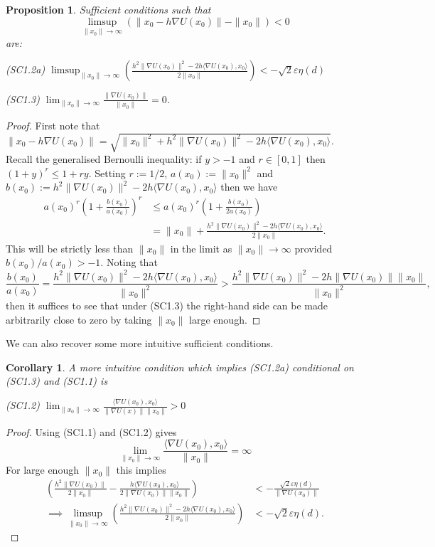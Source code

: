 \documentclass[bj,numbers,noshowframe]{imsart}
\newcommand{\e}{\varepsilon}
\theoremstyle{definition}
\theoremstyle{plain}
\newtheorem{prop}[defn]{Proposition}
\newtheorem{crly}[defn]{Corollary}
\theoremstyle{definition}
\begin{document}
\begin{prop}
Sufficient conditions such that
\[
\limsup_{\|x_{0}\|\to\infty}\left(\|x_{0}-h\nabla U(x_{0})\|-\|x_{0}\|\right)<0
\]
are:


(SC1.2a) $\limsup_{\|x_{0}\|\to\infty}\left(\frac{h^{2}\|\nabla U(x_{0})\|^{2}-2h\langle\nabla U(x_{0}),x_{0}\rangle}{2\|x_{0}\|}\right)< -\sqrt{2} \e \eta(d)$
\vspace{0.3cm}

(SC1.3) $\lim_{\|x_{0}\|\to\infty}\frac{\|\nabla U(x_{0})\|}{\|x_{0}\|}=0$.
\end{prop}
\begin{proof}
First note that $\|x_{0}-h\nabla U(x_{0})\|=\sqrt{\|x_{0}\|^{2}+h^{2}\|\nabla U(x_{0})\|^{2}-2h\langle\nabla U(x_{0}),x_{0}\rangle}$.
Recall the generalised Bernoulli inequality: if $y>-1$ and $r\in[0,1]$
then $\left(1+y\right)^{r}\leq1+ry$. Setting $r:=1/2$, $a(x_{0}):=\|x_{0}\|^{2}$
and $b(x_{0}):=h^{2}\|\nabla U(x_{0})\|^{2}-2h\langle\nabla U(x_{0}),x_{0}\rangle$
then we have
\begin{align*}
a(x_{0})^{r}\left(1+\frac{b(x_{0})}{a(x_{0})}\right)^{r} &\leq a(x_{0})^{r}\left(1+\frac{b(x_{0})}{2a(x_{0})}\right) \\ 
&=\|x_{0}\|+\frac{h^{2}\|\nabla U(x_{0})\|^{2}-2h\langle\nabla U(x_{0}),x_{0}\rangle}{2\|x_{0}\|}.
\end{align*}
This will be strictly less than $\|x_{0}\|$ in the limit as $\|x_{0}\|\to\infty$
provided $b(x_{0})/a(x_{0})>-1$. Noting that
\[
\frac{b(x_{0})}{a(x_{0})}=\frac{h^{2}\|\nabla U(x_{0})\|^{2}-2h\langle\nabla U(x_{0}),x_{0}\rangle}{\|x_{0}\|^{2}}>\frac{h^{2}\|\nabla U(x_{0})\|^{2}-2h\|\nabla U(x_{0})\|\|x_{0}\|}{\|x_{0}\|^{2}},
\]
then it suffices to see that under (SC1.3) the right-hand side can
be made arbitrarily close to zero by taking $\|x_{0}\|$ large enough.
\end{proof}
We can also recover some more intuitive sufficient conditions.
\begin{crly}
\label{crly:intuitive}A more intuitive condition which implies (SC1.2a)
conditional on (SC1.3) and (SC1.1) is
\vspace{0.3cm}

(SC1.2) $\lim_{\|x_{0}\|\to\infty}\frac{\langle\nabla U(x_{0}),x_{0}\rangle}{\|\nabla U(x)\|\|x_{0}\|} >0$
\end{crly}
\begin{proof}
Using (SC1.1) and (SC1.2) gives
\[
\lim_{\|x_{0}\|\to\infty}\frac{\langle\nabla U(x_{0}),x_{0}\rangle}{\|x_{0}\|} = \infty
\]
For large enough $\|x_0\|$ this implies
\begin{align*}
\left(\frac{h^{2}\|\nabla U(x_{0})\|}{2\|x_{0}\|}-\frac{h\langle\nabla U(x_{0}),x_{0}\rangle}{2\|\nabla U(x_{0})\|\|x_{0}\|}\right) &< -\frac{\sqrt{2}\e\eta(d)}{\|\nabla U(x_0) \|} \\
\implies \limsup_{\|x_{0}\|\to\infty}\left(\frac{h^{2}\|\nabla U(x_{0})\|^{2}-2h\langle\nabla U(x_{0}),x_{0}\rangle}{2\|x_{0}\|}\right) &< -\sqrt{2}\e \eta(d).
\end{align*}
\end{proof}
\end{document}
